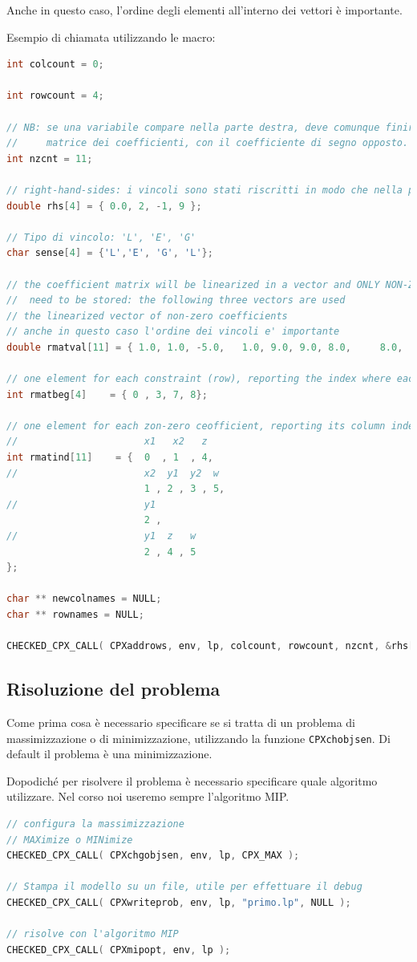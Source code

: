 \noindent Anche in questo caso, l'ordine degli elementi all'interno dei vettori è importante.

Esempio di chiamata utilizzando le macro:

\begin{lstlisting}[language=C++]
int colcount = 0;

int rowcount = 4;

// NB: se una variabile compare nella parte destra, deve comunque finire nella
//     matrice dei coefficienti, con il coefficiente di segno opposto.
int nzcnt = 11;

// right-hand-sides: i vincoli sono stati riscritti in modo che nella parte destra non compaiano variabili
double rhs[4] = { 0.0, 2, -1, 9 };

// Tipo di vincolo: 'L', 'E', 'G'
char sense[4] = {'L','E', 'G', 'L'};

// the coefficient matrix will be linearized in a vector and ONLY NON-ZERO coefficients
//  need to be stored: the following three vectors are used
// the linearized vector of non-zero coefficients
// anche in questo caso l'ordine dei vincoli e' importante
double rmatval[11] = { 1.0, 1.0, -5.0,   1.0, 9.0, 9.0, 8.0,     8.0,      -4.0, 7.0, 5.0 };

// one element for each constraint (row), reporting the index where each row of the coefficient matrix starts
int rmatbeg[4]    = { 0 , 3, 7, 8};

// one element for each zon-zero ceofficient, reporting its column index 
//                      x1   x2   z 
int rmatind[11]    = {  0  , 1  , 4,
//                      x2  y1  y2  w
                        1 , 2 , 3 , 5,
//                      y1
                        2 ,
//                      y1  z   w
                        2 , 4 , 5
};

char ** newcolnames = NULL;
char ** rownames = NULL;

CHECKED_CPX_CALL( CPXaddrows, env, lp, colcount, rowcount, nzcnt, &rhs[0], &sense[0], &rmatbeg[0], &rmatind[0], &rmatval[0], newcolnames , rownames );
\end{lstlisting}

\subsection{Risoluzione del problema}

Come prima cosa è necessario specificare se si tratta di un problema di massimizzazione o di minimizzazione, utilizzando la funzione \texttt{CPXchobjsen}. Di default il problema è una minimizzazione.

Dopodiché per risolvere il problema è necessario specificare quale algoritmo utilizzare. Nel corso noi useremo sempre l'algoritmo MIP.

\begin{lstlisting}[language=C++]
// configura la massimizzazione
// MAXimize o MINimize
CHECKED_CPX_CALL( CPXchgobjsen, env, lp, CPX_MAX );

// Stampa il modello su un file, utile per effettuare il debug
CHECKED_CPX_CALL( CPXwriteprob, env, lp, "primo.lp", NULL );

// risolve con l'algoritmo MIP
CHECKED_CPX_CALL( CPXmipopt, env, lp );
\end{lstlisting}
